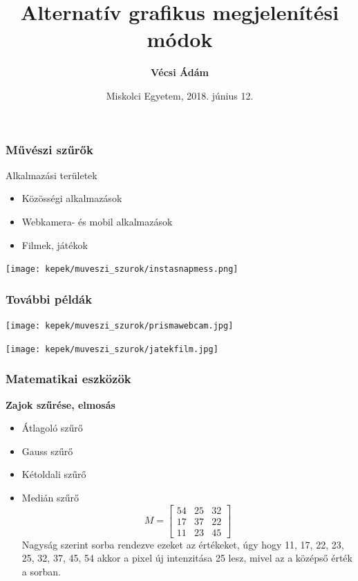 \documentclass{beamer}
\begin{document}

\title[Alternatív grafikus megjelenítési módok]{Alternatív grafikus megjelenítési módok}
\author[Vécsi Ádám]{\textbf{Vécsi Ádám}}
\date{Miskolci Egyetem, 2018. június 12.}

\frame{\titlepage}

\begin{frame}[fragile]
\frametitle{Művészi szűrők}

Alkalmazási területek
\begin{itemize}
\item Közösségi alkalmazások
\item Webkamera- és mobil alkalmazások
\item Filmek, játékok
\end{itemize}

\bigskip

\begin{center}
\texttt{[image: kepek/muveszi\_szurok/instasnapmess.png]}
\end{center}

\end{frame}

\begin{frame}[fragile]
\frametitle{További példák}

\begin{center}
\texttt{[image: kepek/muveszi\_szurok/prismawebcam.jpg]}
\end{center}

\begin{center}
\texttt{[image: kepek/muveszi\_szurok/jatekfilm.jpg]}
\end{center}

\end{frame}

\begin{frame}[fragile]
\frametitle{Matematikai eszközök}

\textbf{Zajok szűrése, elmosás}

\begin{itemize}
\item Átlagoló szűrő
\item Gauss szűrő
\item Kétoldali szűrő
\item Medián szűrő
$$M =
\begin{bmatrix}
54 &25  &32 \\ 
17 &37  &22 \\ 
11 &23  &45 
\end{bmatrix}$$
Nagyság szerint sorba rendezve ezeket az értékeket, úgy hogy  11, 17, 22, 23, 25, 32, 37, 45, 54 akkor a pixel új intenzitása 25 lesz, mivel az a középső érték a sorban.
\end{itemize}
\end{frame}
\end{document}
